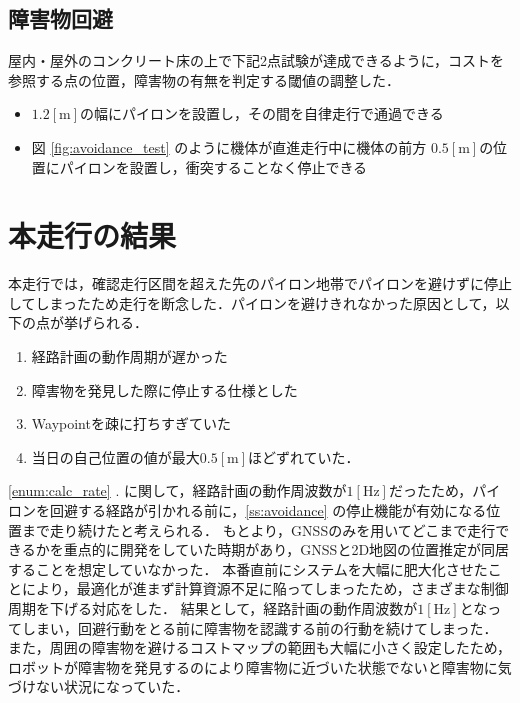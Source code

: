 \documentclass[platex,dvipdfmx]{rbproceedings}
\begin{document}
\subsection{障害物回避}

屋内・屋外のコンクリート床の上で下記2点試験が達成できるように，コストを参照する点の位置，障害物の有無を判定する閾値の調整した．
\begin{itemize}
    \item $1.2[\mathrm{m}]$の幅にパイロンを設置し，その間を自律走行で通過できる
    \item 図 \ref{fig:avoidance_test} のように機体が直進走行中に機体の前方  $0.5[\mathrm{m}]$の位置にパイロンを設置し，衝突することなく停止できる
\end{itemize}

\section{本走行の結果}
本走行では，確認走行区間を超えた先のパイロン地帯でパイロンを避けずに停止してしまったため走行を断念した．パイロンを避けきれなかった原因として，以下の点が挙げられる．

\begin{enumerate}
    \item 経路計画の動作周期が遅かった \label{enum:calc_rate}
    \item 障害物を発見した際に停止する仕様とした \label{enum:stop}
    \item Waypointを疎に打ちすぎていた \label{eunm:waypoint}
    \item 当日の自己位置の値が最大$0.5[ \mathrm{m}]$ほどずれていた．\label{eunm:gnss}
\end{enumerate}

\ref{enum:calc_rate} . に関して，経路計画の動作周波数が$1[ \mathrm{Hz}]$だったため，パイロンを回避する経路が引かれる前に，\ref{ss:avoidance} の停止機能が有効になる位置まで走り続けたと考えられる．
もとより，GNSSのみを用いてどこまで走行できるかを重点的に開発をしていた時期があり，GNSSと2D地図の位置推定が同居することを想定していなかった．
本番直前にシステムを大幅に肥大化させたことにより，最適化が進まず計算資源不足に陥ってしまったため，さまざまな制御周期を下げる対応をした．
結果として，経路計画の動作周波数が$1[ \mathrm{Hz}]$となってしまい，回避行動をとる前に障害物を認識する前の行動を続けてしまった．
また，周囲の障害物を避けるコストマップの範囲も大幅に小さく設定したため，ロボットが障害物を発見するのにより障害物に近づいた状態でないと障害物に気づけない状況になっていた．
\end{document}
